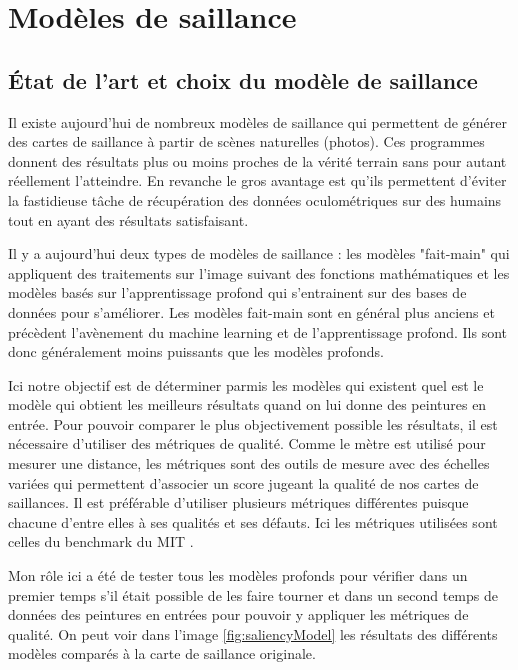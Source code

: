 \chapter{Modèles de saillance}

\section{État de l'art et choix du modèle de saillance}

\par
Il existe aujourd'hui de nombreux modèles de saillance qui permettent de générer des cartes de saillance à partir de scènes naturelles (photos). Ces programmes donnent des résultats plus ou moins proches de la vérité terrain sans pour autant réellement l'atteindre. En revanche le gros avantage est qu'ils permettent d'éviter la fastidieuse tâche de récupération des données oculométriques sur des humains tout en ayant des résultats satisfaisant.

\par
Il y a aujourd'hui deux types de modèles de saillance : les modèles "fait-main" qui appliquent des traitements sur l'image suivant des fonctions mathématiques et les modèles basés sur l'apprentissage profond qui s'entrainent sur des bases de données pour s'améliorer. Les modèles fait-main sont en général plus anciens et précèdent l'avènement du machine learning et de l'apprentissage profond. Ils sont donc généralement moins puissants que les modèles profonds.

\par
Ici notre objectif est de déterminer parmis les modèles qui existent quel est le modèle qui obtient les meilleurs résultats quand on lui donne des peintures en entrée. Pour pouvoir comparer le plus objectivement possible les résultats, il est nécessaire d'utiliser des métriques de qualité. Comme le mètre est utilisé pour mesurer une distance, les métriques sont des outils de mesure avec des échelles variées qui permettent d'associer un score jugeant la qualité de nos cartes de saillances. Il est préférable d'utiliser plusieurs métriques différentes puisque chacune d'entre elles à ses qualités et ses défauts. Ici les métriques utilisées sont celles du benchmark du MIT \cite{benchmark_MIT}.

\par
Mon rôle ici a été de tester tous les modèles profonds pour vérifier dans un premier temps s'il était possible de les faire tourner et dans un second temps de données des peintures en entrées pour pouvoir y appliquer les métriques de qualité. On peut voir dans l'image \ref{fig:saliencyModel} les résultats des différents modèles comparés à la carte de saillance originale. 

